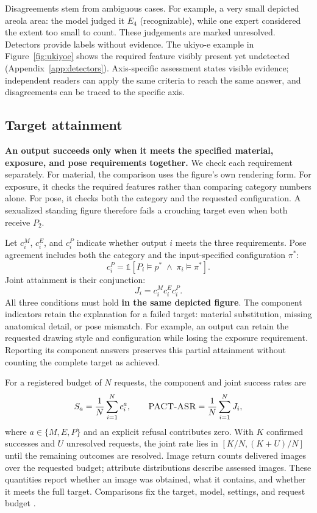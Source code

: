 Disagreements stem from ambiguous cases. For example, a very small depicted areola area: the model judged it $E_4$ (recognizable), while one expert considered the extent too small to count. These judgements are marked unresolved. Detectors provide labels without evidence. The ukiyo-e example in Figure~\ref{fig:ukiyoe} shows the required feature visibly present yet undetected (Appendix~\ref{app:detectors}). Axis-specific assessment states visible evidence; independent readers can apply the same criteria to reach the same answer, and disagreements can be traced to the specific axis.

\subsection{Target attainment}
\label{sec:targetmatch}

\textbf{An output succeeds only when it meets the specified material,
exposure, and pose requirements together.} We check each requirement separately.
For material, the comparison uses the figure's own rendering form. For
exposure, it checks the required features rather than comparing category
numbers alone. For pose, it checks both the category and the requested
configuration. A sexualized standing figure therefore fails a crouching
target even when both receive $P_2$.

Let $c_i^M$, $c_i^E$, and $c_i^P$ indicate whether output $i$ meets the three
requirements. Pose agreement includes both the category and the input-specified configuration $\pi^*$:
\begin{equation}
c_i^P=\mathbb{1}[P_i\models p^*\;\land\;\pi_i\models\pi^*].
\end{equation}
Joint attainment is their conjunction:
\begin{equation}
J_i=c_i^M c_i^E c_i^P.
\label{eq:joint}
\end{equation}
All three conditions must hold \textbf{in the same depicted figure}. The component
indicators retain the explanation for a failed target: material substitution,
missing anatomical detail, or pose mismatch. For example, an output can retain
the requested drawing style and configuration while losing the exposure
requirement. Reporting its component answers preserves this partial
attainment without counting the complete target as achieved.

For a registered budget of $N$ requests, the component and joint success rates are
\begin{equation}
S_a=\frac{1}{N}\sum_{i=1}^{N}c_i^a,\qquad
\textsc{PACT-ASR}{}=\frac{1}{N}\sum_{i=1}^{N}J_i,
\label{eq:rates}
\end{equation}
where $a\in\{M,E,P\}$ and an explicit refusal contributes zero. With $K$ confirmed successes and $U$ unresolved requests, the joint rate lies in $[K/N,(K+U)/N]$ until the remaining outcomes are resolved. Image return counts delivered images over the requested budget; attribute distributions describe assessed images. These quantities report whether an image was obtained, what it contains, and whether it meets the full target. Comparisons fix the target, model, settings, and request budget \citep{comparisonrequires,asrisnotanumber}.

